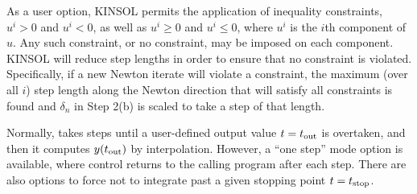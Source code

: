 As a user option, KINSOL permits the application of inequality
constraints, $u^i > 0$ and $u^i < 0$, as well as $u^i \geq 0$ and
$u^i \leq 0$, where $u^i$ is the $i$th component of $u$.  Any such
constraint, or no constraint, may be imposed on each component.
KINSOL will reduce step lengths in order to ensure that no
constraint is violated.  Specifically, if a new Newton iterate
will violate a constraint, the maximum (over all $i$) step length
along the Newton direction that will satisfy all constraints is
found and $\delta_n$ in Step 2(b) is scaled to take a step of that
length.


Normally, {\cvodes} takes steps until a user-defined output value
$t = t_{\mbox{\scriptsize out}}$ is overtaken, and then it computes
$y(t_{\mbox{\scriptsize out}})$ by interpolation.  However, a
``one step'' mode option is available, where control returns to the
calling program after each step.  There are also options to force
{\cvodes} not to integrate past a given stopping point
$t = t_{\mbox{\scriptsize stop}}$.
